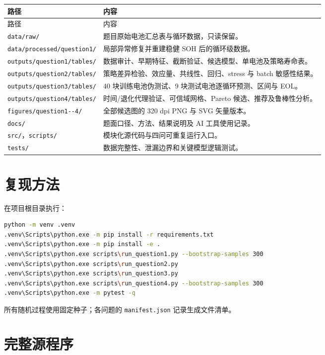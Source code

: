 \documentclass[UTF8,a4paper,zihao=-4]{ctexart}
\begin{document}
\begin{longtable}{p{}p{}}
\toprule
路径 & 内容 \\
\midrule
\endfirsthead
\toprule
路径 & 内容 \\
\midrule
\endhead
\nolinkurl{data/raw/} & 题目原始电池汇总表与循环数据，只读保留。 \\
\nolinkurl{data/processed/question1/} & 局部异常修复并重建稳健 SOH 后的循环级数据。 \\
\nolinkurl{outputs/question1/tables/} & 数据审计、早期特征、截断验证、候选模型、单电池及策略寿命表。 \\
\nolinkurl{outputs/question2/tables/} & 策略差异检验、效应量、共线性、回归、stress 与 batch 敏感性结果。 \\
\nolinkurl{outputs/question3/tables/} & 40 块训练电池伪测试、9 块测试电池逐循环预测、区间与 EOL。 \\
\nolinkurl{outputs/question4/tables/} & 时间/退化代理验证、可信域网格、Pareto 候选、推荐及鲁棒性分析。 \\
\nolinkurl{figures/question1--4/} & 全部候选图的 320 dpi PNG 与 SVG 矢量版本。 \\
\nolinkurl{docs/} & 题面口径、方法、结果说明及 AI 工具使用记录。 \\
\nolinkurl{src/}，\nolinkurl{scripts/} & 模块化源代码与四问可重复运行入口。 \\
\nolinkurl{tests/} & 数据完整性、泄漏边界和关键模型逻辑测试。 \\
\bottomrule
\end{longtable}

\section{复现方法}

在项目根目录执行：
\begin{lstlisting}[language=bash]
python -m venv .venv
.venv\Scripts\python.exe -m pip install -r requirements.txt
.venv\Scripts\python.exe -m pip install -e .
.venv\Scripts\python.exe scripts\run_question1.py --bootstrap-samples 300
.venv\Scripts\python.exe scripts\run_question2.py
.venv\Scripts\python.exe scripts\run_question3.py
.venv\Scripts\python.exe scripts\run_question4.py --bootstrap-samples 300
.venv\Scripts\python.exe -m pytest -q
\end{lstlisting}
所有随机过程使用固定种子；各问题的 \texttt{manifest.json} 记录生成文件清单。

\section{完整源程序}
\end{document}
